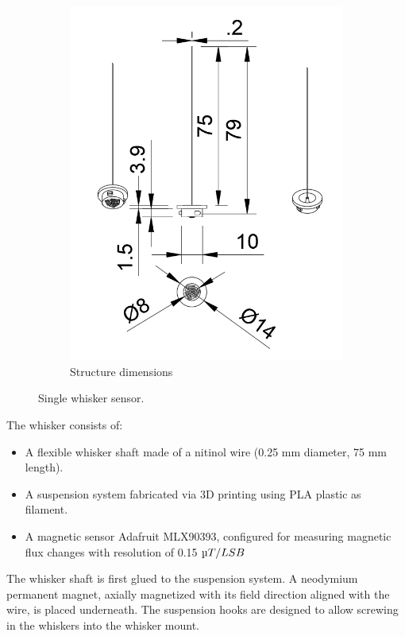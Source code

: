 \begin{figure}[ht]
\begin{subfigure}{0.31\textwidth}
        \includegraphics[width=\linewidth]{figures/whisker-dims}
        \caption{Structure dimensions} \label{fig:whisker-dims}
    \end{subfigure}
    \caption{Single whisker sensor.}
    \label{fig:whisker_composite}
\end{figure}

The whisker consists of:
\begin{itemize}
    \item A flexible whisker shaft made of a nitinol wire (0.25 mm diameter, 75 mm length).
    \item A suspension system fabricated via 3D printing using PLA plastic as filament.
    \item A magnetic sensor Adafruit MLX90393, configured for measuring magnetic flux changes with resolution of 0.15 $\micro T/LSB$
\end{itemize}
The whisker shaft is first glued to the suspension system.
A neodymium permanent magnet, axially magnetized with its field direction aligned with the wire, is placed underneath.
The suspension hooks are designed to allow screwing in the whiskers into the whisker mount.


